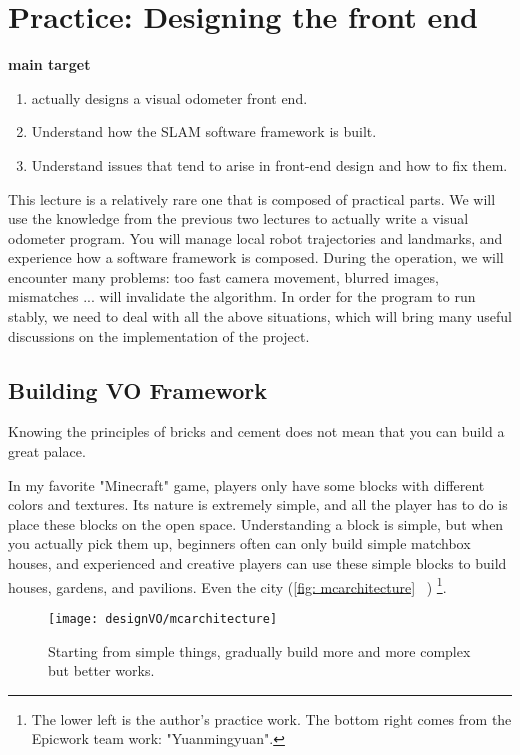 \chapter{Practice: Designing the front end}
\begin{mdframed}
\textbf{main target}
\begin{enumerate}[labelindent = 0em, leftmargin = 1.5em]
\item actually designs a visual odometer front end.
\item Understand how the SLAM software framework is built.
\item Understand issues that tend to arise in front-end design and how to fix them.
\end{enumerate}
\end{mdframed}

This lecture is a relatively rare one that is composed of practical parts. We will use the knowledge from the previous two lectures to actually write a visual odometer program. You will manage local robot trajectories and landmarks, and experience how a software framework is composed. During the operation, we will encounter many problems: too fast camera movement, blurred images, mismatches ... will invalidate the algorithm. In order for the program to run stably, we need to deal with all the above situations, which will bring many useful discussions on the implementation of the project.

\newpage
\section{Building VO Framework}
Knowing the principles of bricks and cement does not mean that you can build a great palace.

In my favorite "Minecraft" game, players only have some blocks with different colors and textures. Its nature is extremely simple, and all the player has to do is place these blocks on the open space. Understanding a block is simple, but when you actually pick them up, beginners often can only build simple matchbox houses, and experienced and creative players can use these simple blocks to build houses, gardens, and pavilions. Even the city (\autoref{fig: mcarchitecture} ~) \footnote{The lower left is the author's practice work. The bottom right comes from the Epicwork team work: "Yuanmingyuan". }.

\begin{figure}[!htp]
\centering
\texttt{[image: designVO/mcarchitecture]} \\
\caption{Starting from simple things, gradually build more and more complex but better works. }
\label{fig: mcarchitecture}
\end{figure}

